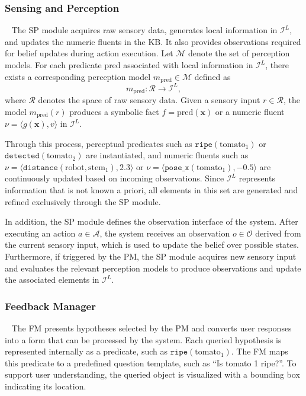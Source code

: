 \subsubsection{Sensing and Perception}~\label{method:SP}
The SP module acquires raw sensory data, generates local information in $\mathcal{I}^{L}$, and updates the numeric fluents in the KB. It also provides observations required for belief updates during action execution. Let $\mathcal{M}$ denote the set of perception models. For each predicate $\text{pred}$ associated with local information in $\mathcal{I}^{L}$, there exists a corresponding perception model $m_{\text{pred}} \in \mathcal{M}$ defined as
\[
m_{\text{pred}} : \mathcal{R} \rightarrow \mathcal{I}^{L},
\]
where $\mathcal{R}$ denotes the space of raw sensory data. Given a sensory input $r \in \mathcal{R}$, the model $m_{\text{pred}}(r)$ produces a symbolic fact $f = \text{pred}(\mathbf{x})$ or a numeric fluent $\nu = \langle g(\mathbf{x}), v \rangle$ in $\mathcal{I}^{L}$.

Through this process, perceptual predicates such as $\texttt{ripe}(\text{tomato}_1)$ or $\texttt{detected}(\text{tomato}_2)$ are instantiated, and numeric fluents such as $\nu = \langle \texttt{distance}(\text{robot}, \text{stem}_1), 2.3 \rangle$ or $\nu = \langle \texttt{pose\_x}(\text{tomato}_1), -0.5 \rangle$ are continuously updated based on incoming observations. Since $\mathcal{I}^{L}$ represents information that is not known a priori, all elements in this set are generated and refined exclusively through the SP module.

In addition, the SP module defines the observation interface of the system. After executing an action $a \in \mathcal{A}$, the system receives an observation $o \in \mathcal{O}$ derived from the current sensory input, which is used to update the belief over possible states. Furthermore, if triggered by the PM, the SP module acquires new sensory input and evaluates the relevant perception models to produce observations and update the associated elements in $\mathcal{I}^{L}$.





\subsubsection{Feedback Manager}~\label{method:FM}
The FM presents hypotheses selected by the PM and converts user responses into a form that can be processed by the system. Each queried hypothesis is represented internally as a predicate, such as $\texttt{ripe}(\text{tomato}_1)$. The FM maps this predicate to a predefined question template, such as ``Is tomato 1 ripe?''. To support user understanding, the queried object is visualized with a bounding box indicating its location.

